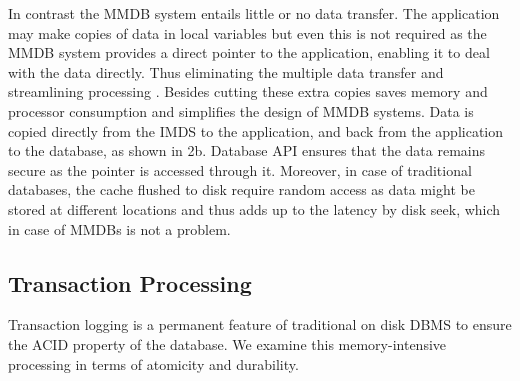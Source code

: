 \documentclass[12pt]{article} %
\begin{document}
In contrast the MMDB system entails little or no data transfer. The application may make copies of data in local variables but even this is not required as the MMDB system provides a direct pointer to the application, enabling it to deal with the data directly. Thus eliminating the multiple data transfer and streamlining processing . Besides cutting these extra copies saves memory and processor consumption and simplifies the design of MMDB systems. Data is copied directly from the IMDS to the application, and back from the application to the database, as shown in \figurename{2b}. Database API ensures that the data remains secure as the pointer is accessed through it. Moreover, in case of traditional databases, the cache flushed to disk require random access as data might be stored at different locations and thus adds up to the latency by disk seek, which in case of MMDBs is not a problem.
 
\subsection{Transaction Processing}
Transaction logging is a permanent feature of traditional on disk DBMS to ensure the ACID property of the database. We examine this memory-intensive processing in terms of atomicity and durability. 
\end{document}
